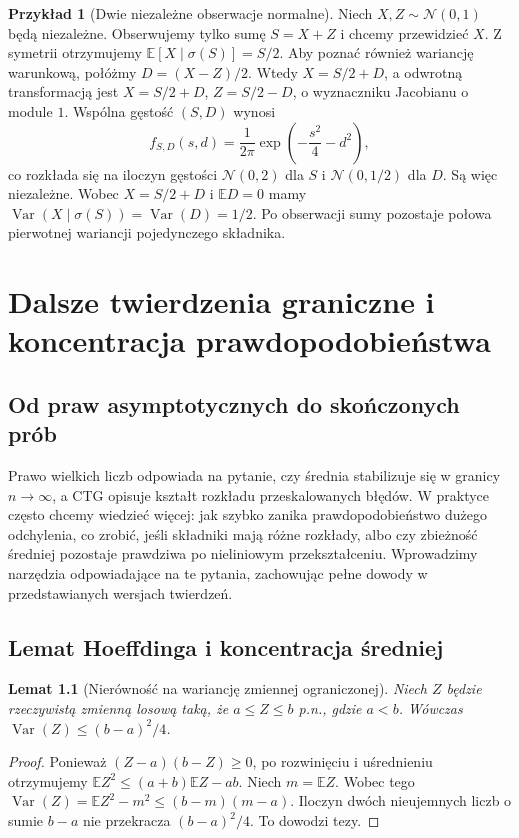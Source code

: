 \documentclass[11pt,a4paper,oneside]{report}
\numberwithin{equation}{chapter}
\theoremstyle{plain}
\newtheorem{lemat}[twierdzenie]{Lemat}
\theoremstyle{definition}
\newtheorem{przyklad}{Przykład}[chapter]
\theoremstyle{remark}
\newcommand{\E}{\mathbb{E}}
\newcommand{\Var}{\operatorname{Var}}
\newcommand{\Normal}{\mathcal{N}}
\begin{document}
\begin{przyklad}[Dwie niezależne obserwacje normalne]
Niech $X,Z\sim\Normal(0,1)$ będą niezależne.
Obserwujemy tylko sumę $S=X+Z$ i chcemy
przewidzieć $X$. Z symetrii otrzymujemy
$\E[X\mid\sigma(S)]=S/2$.
Aby poznać również wariancję warunkową,
połóżmy $D=(X-Z)/2$. Wtedy
$X=S/2+D$, a odwrotną transformacją jest
$X=S/2+D$, $Z=S/2-D$, o wyznaczniku
Jacobianu o module $1$. Wspólna gęstość
$(S,D)$ wynosi
\[
f_{S,D}(s,d)=\frac1{2\pi}
\exp\left(-\frac{s^2}{4}-d^2\right),
\]
co rozkłada się na iloczyn gęstości
$\Normal(0,2)$ dla $S$ i $\Normal(0,1/2)$
dla $D$. Są więc niezależne.
Wobec $X=S/2+D$ i $\E D=0$ mamy
$\Var(X\mid\sigma(S))=\Var(D)=1/2$.
Po obserwacji sumy pozostaje połowa pierwotnej
wariancji pojedynczego składnika.
\end{przyklad}

\chapter{Dalsze twierdzenia graniczne i koncentracja prawdopodobieństwa}
\label{ch:advancedlimits}

\section{Od praw asymptotycznych do skończonych prób}

Prawo wielkich liczb odpowiada na pytanie, czy średnia
stabilizuje się w granicy $n\to\infty$, a CTG opisuje
kształt rozkładu przeskalowanych błędów. W praktyce
często chcemy wiedzieć więcej: jak szybko zanika
prawdopodobieństwo dużego odchylenia, co zrobić, jeśli
składniki mają różne rozkłady, albo czy zbieżność
średniej pozostaje prawdziwa po nieliniowym
przekształceniu. Wprowadzimy narzędzia
odpowiadające na te pytania, zachowując pełne
dowody w przedstawianych wersjach twierdzeń.

\section{Lemat Hoeffdinga i koncentracja średniej}

\begin{lemat}[Nierówność na wariancję zmiennej ograniczonej]
Niech $Z$ będzie rzeczywistą zmienną losową taką,
że $a\leq Z\leq b$ p.n., gdzie $a<b$.
Wówczas $\Var(Z)\leq(b-a)^2/4$.
\end{lemat}
\begin{proof}
Ponieważ $(Z-a)(b-Z)\geq0$, po rozwinięciu
i uśrednieniu otrzymujemy
$\E Z^2\leq(a+b)\E Z-ab$.
Niech $m=\E Z$. Wobec tego
$\Var(Z)=\E Z^2-m^2\leq(b-m)(m-a)$.
Iloczyn dwóch nieujemnych liczb o sumie $b-a$
nie przekracza $(b-a)^2/4$. To dowodzi tezy.
\end{proof}
\end{document}

